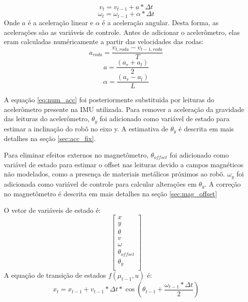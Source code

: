 \documentclass[
	12pt,				%
	openright,			%
	twoside,			%
	convert,
	a4paper,			%
	english,			%
	french,				%
	spanish,			%
	brazil				%
	]{abntex2}
\begin{document}
\begin{equation}
	v_t = v_{t-1} + a * \Delta t
\end{equation}
\begin{equation}
	\omega_t = \omega_{t-1} + \alpha * \Delta t
\end{equation}
Onde $a$ é a aceleração linear e $\alpha$ é a aceleração angular. Desta forma, as acelerações são as variáveis de controle. Antes de adicionar o acelerômetro, elas eram calculadas numéricamente a partir das velocidades das rodas:
\begin{equation}
	a_{roda} = \frac{v_{t,roda} - v_{t-1,roda}}{T}
\end{equation}
\begin{equation}
	a = \frac{(a_r + a_l)}{2}
\end{equation}
\begin{equation} \label{eq:num_acc}
	\alpha = \frac{(a_r - a_l)}{L}
\end{equation}
\par
A equação \ref{eq:num_acc} foi posteriormente substituida por leituras do acelerômetro presente na IMU utilizada. Para remover a aceleração da gravidade das leituras do acelerômetro, $\theta_y$ foi adicionado como variável de estado para estimar a inclinação do robô no eixo y. A estimativa de $\theta_y$ é descrita em mais detalhes na seção \ref{sec:acc_fix}.
\par
Para eliminar efeitos externos no magnetômetro, $\theta_{offset}$ foi adicionado como variável de estado para estimar o offset nas leituras devido a campos magnéticos não modelados, como a presença de materiais metálicos próximos ao robô. $\omega_y$ foi adicionada como variável de controle para calcular alterações em $\theta_y$. A correção no magnetômetro é descrita em mais detalhes na seção \ref{sec:mag_offset}
\par
O vetor de variáveis de estado é:
\[
\begin{bmatrix}
	x\\
	y\\
	\theta \\
	v\\
	\omega \\
	\theta_{offset} \\
	\theta_y \\
\end{bmatrix}
\]
A equação de transição de estados $f(\mu _{t-1}, u)$ é:
\begin{equation}
	x_t = x_{t-1} + v_{t-1} * \Delta t * \cos(\theta_{t-1} + \frac{\omega_{t-1} * \Delta t}{2})
\end{equation}
\end{document}
